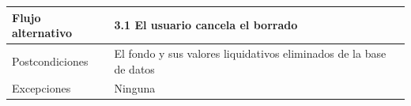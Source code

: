 \documentclass[12pt, a4paper]{book}
\begin{document}
\begin{table}[htbp]
\begin{tabular}{|l|l|}
		Flujo alternativo & 3.1 El usuario cancela el borrado                                                                                                                                                                                                                                                                                                    \\ \hline
		Postcondiciones   & El fondo y sus valores liquidativos eliminados de la base de datos                                                                                                                                                                                                                                                                                               \\ \hline
		Excepciones       & Ninguna                                                                                                                                                                    \\ \hline
	\end{tabular}
\end{table}
\end{document}
